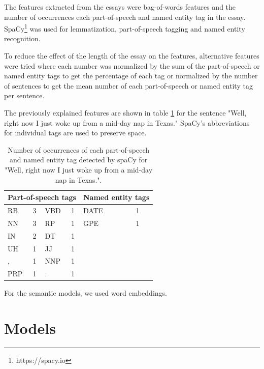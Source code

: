 \documentclass[10pt, a4paper]{article}
\begin{document}
The features extracted from the essays were bag-of-words features and the number of occurrences each part-of-speech and named entity tag in the essay.
SpaCy\footnote{https://spacy.io} was used for lemmatization, part-of-speech tagging and named entity recognition.

To reduce the effect of the length of the essay on the features, alternative features were tried where each number was normalized by the sum of the part-of-speech or named entity tags to get the percentage of each tag or normalized by the number of sentences to get the mean number of each part-of-speech or named entity tag per sentence.

The previously explained features are shown in table \ref{example features} for the sentence "Well, right now I just woke up from a mid-day nap in Texas."
SpaCy's abbreviations for individual tags are used to preserve space.

\begin{table}[H]
	\centering
	\caption{Number of occurrences of each part-of-speech and named entity tag detected by spaCy for "Well, right now I just woke up from a mid-day nap in Texas.".}
	\begin{tabular}{llllll}
		\toprule
		\multicolumn{4}{l}{Part-of-speech tags} & \multicolumn{2}{l}{Named entity tags} \\ \midrule
		RB        & 3       & VBD      & 1      & DATE                & 1               \\
		NN        & 3       & RP       & 1      & GPE                 & 1               \\ \cline{5-6} 
		IN        & 2       & DT       & 1      &                     &                 \\
		UH        & 1       & JJ       & 1      &                     &                 \\
		,         & 1       & NNP      & 1      &                     &                 \\
		PRP       & 1       & .        & 1      &                     &                 \\ \cline{1-4}
	\end{tabular}
	\label{example features}
\end{table}

For the semantic models, we used word embeddings.

\section{Models}
\end{document}
